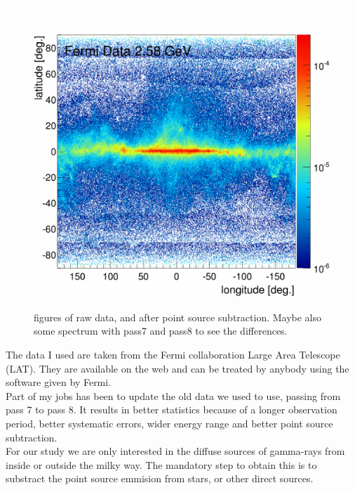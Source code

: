 \begin{figure}[h]
\begin{minipage}[h]{0.45\textwidth}
	  \includegraphics[width=1.\linewidth]{pic/method/Flux_FermiData-3FGL_E12.png}
	  \label{fig:BKGonly_bubble_spec}
  \end{minipage}
  \caption{figures of raw data, and after point source subtraction. Maybe also some spectrum with pass7 and pass8 to see the differences.}
  \label{fig:method_pass8} 
\end{figure}


The data I used are taken from the Fermi collaboration Large Area Telescope (LAT). They are available on the web and can be treated by anybody using the software given by Fermi.\\

Part of my jobs has been to update the old data we used to use, passing from pass 7 to pass 8. It results in better statistics because of a longer observation period, better systematic errors, wider energy range and better point source subtraction.\\

For our study we are only interested in the diffuse sources of gamma-rays from inside or outside the milky way. The mandatory step to obtain this is to substract the point source emmision from stars, or other direct sources.\\

